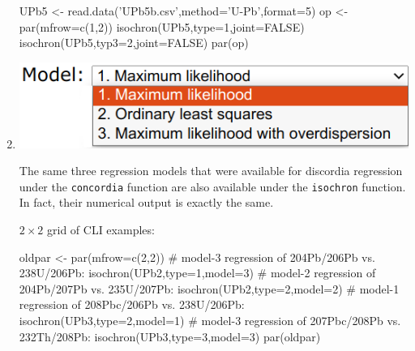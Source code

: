 \begin{refsection}
\begin{enumerate}
\begin{script}
UPb5 <- read.data('UPb5b.csv',method='U-Pb',format=5)
op <- par(mfrow=c(1,2))
isochron(UPb5,type=1,joint=FALSE)
isochron(UPb5,typ3=2,joint=FALSE)
par(op)
\end{script}

\item \noindent\begin{minipage}[t]{.45\linewidth}
  \strut\vspace*{-\baselineskip}\newline
  \includegraphics[width=\linewidth]{../figures/UPbIsochronModels.png}
\end{minipage}
\begin{minipage}[t]{.55\linewidth}
  The same three regression models that were available for discordia
  regression under the \texttt{concordia} function are also available
  under the \texttt{isochron} function.  In fact, their numerical
  output is exactly the same.
\end{minipage}

\noindent $2\times{2}$ grid of CLI examples:
\begin{script}
oldpar <- par(mfrow=c(2,2))
# model-3 regression of 204Pb/206Pb vs. 238U/206Pb:
isochron(UPb2,type=1,model=3)
# model-2 regression of 204Pb/207Pb vs. 235U/207Pb:
isochron(UPb2,type=2,model=2)
# model-1 regression of 208Pbc/206Pb vs. 238U/206Pb:
isochron(UPb3,type=2,model=1)
# model-3 regression of 207Pbc/208Pb vs. 232Th/208Pb:
isochron(UPb3,type=3,model=3)
par(oldpar)
\end{script}


\end{enumerate}
\end{refsection}
